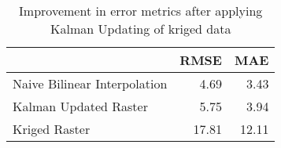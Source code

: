 \begin{table}
\centering
\caption{Improvement in error metrics after applying Kalman Updating of kriged data}
\label{tab:oahu7_gebco_raster_error}
\begin{tabular}{lrr}
\toprule
 & RMSE & MAE \\
\midrule
Naive Bilinear Interpolation & 4.69 & 3.43 \\
Kalman Updated Raster & 5.75 & 3.94 \\
Kriged Raster & 17.81 & 12.11 \\
\bottomrule
\end{tabular}
\end{table}
